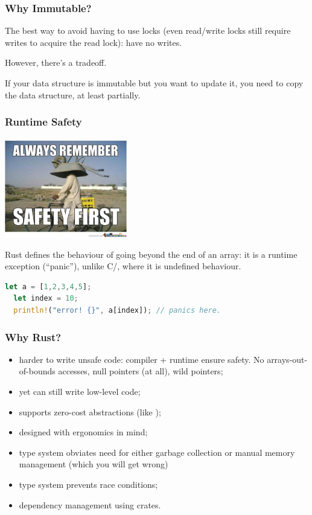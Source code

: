 \begin{frame}
\frametitle{Why Immutable?}

The best way to avoid having
to use locks (even read/write locks still require writes to acquire
the read lock): have no writes.  

However, there's a tradeoff. 

If your
data structure is immutable but you want to update it, you need to copy the data structure, at least
partially.


\end{frame}


\begin{frame}[fragile]
\frametitle{Runtime Safety}

\begin{center}
	\includegraphics[width=0.4\textwidth]{images/safetyfirst.jpg}
\end{center}

Rust defines
the behaviour of going beyond the end of an array: it is a runtime exception (``panic''),
unlike C/\CPP, where it is undefined behaviour.

\begin{lstlisting}[language=Rust]
  let a = [1,2,3,4,5];
  let index = 10;
  println!("error! {}", a[index]); // panics here.
\end{lstlisting}

\end{frame}

\begin{frame}
\frametitle{Why Rust?}

\begin{itemize}
\item harder to write unsafe code: compiler + runtime ensure safety. No arrays-out-of-bounds accesses, null pointers (at all), wild pointers;
\item yet can still write low-level code;
\item supports zero-cost abstractions (like \CPP);
\item designed with ergonomics in mind;
\item type system obviates need for either garbage collection or manual memory management (which you will get wrong)
\item type system prevents race conditions;
\item dependency management using crates.
\end{itemize}


\end{frame}


